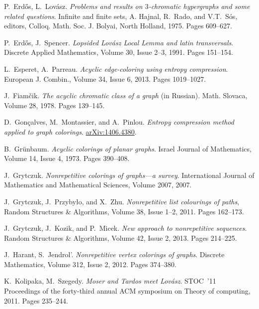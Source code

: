 \documentclass[10pt]{article}
\numberwithin{equation}{subsection}
\theoremstyle{definition}
\begin{document}
\begin{thebibliography}{99}
		 P.~Erd\H{o}s, L.~Lov\'{a}sz. \emph{Problems and results on $3$-chromatic hypergraphs and some related questions}. Infinite and finite sets, A. Hajnal, R.~Rado, and V.T.~S\'{o}s, editors, Colloq. Math. Soc. J. Bolyai, North Holland, 1975. Pages 609--627.
		
		 P.~Erd\H{o}s, J.~Spencer. \emph{Lopsided Lov\'{a}sz Local Lemma and latin transversals}. Discrete Applied Mathematics, Volume 30, Issue 2--3, 1991. Pages 151--154.	
		
		 L.~Esperet, A.~Parreau. \emph{Acyclic edge-coloring using entropy compression}. European J. Combin., Volume 34, Issue 6, 2013. Pages 1019--1027.
		
		 J.~Fiam\v{c}ik. \emph{The acyclic chromatic class of a graph} (in Russian). Math. Slovaca, Volume 28, 1978. Pages 139--145.
		
		 D.~Gon\c{c}alves, M.~Montassier, and A.~Pinlou. \emph{Entropy compression method applied to graph colorings}. \href{http://arxiv.org/abs/1406.4380}{arXiv:1406.4380}.
		
		  B.~Gr\"{u}nbaum. \emph{Acyclic colorings of planar graphs}. Israel Journal of Mathematics, Volume 14, Issue 4, 1973. Pages 390--408.
		
		 J.~Grytczuk. \emph{Nonrepetitive colorings of graphs---a survey}. International Journal of Mathematics and Mathematical Sciences, Volume 2007, 2007.
		
		 J.~Grytczuk, J.~Przyby\l{}o, and X.~Zhu. \emph{Nonrepetitive list colourings of paths}, Random Structures \& Algorithms, Volume 38, Issue 1--2, 2011. Pages 162--173.
		
		 J.~Grytczuk, J.~Kozik, and P.~Micek. \emph{New approach to nonrepetitive sequences}. Random Structures \& Algorithms, Volume 42, Issue 2, 2013. Pages 214--225.
		
		 J.~Harant, S.~Jendrol'. \emph{Nonrepetitive vertex colorings of graphs}. Discrete Mathematics, Volume 312, Issue 2, 2012. Pages 374--380.
		
		 K.~Kolipaka, M.~Szegedy. \emph{Moser and Tardos meet Lov\'{a}sz}. STOC~'11 Proceedings of the forty-third annual ACM symposium on Theory of computing, 2011. Pages 235--244.
		
		

\end{thebibliography}
\end{document}
